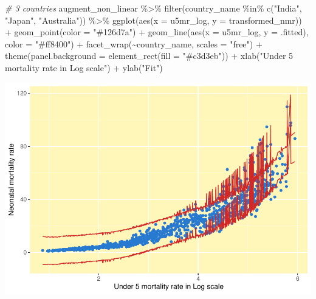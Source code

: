 \documentclass[
]{article}
\newenvironment{Shaded}{\begin{snugshade}}{\end{snugshade}}
\newcommand{\AttributeTok}[1]{\textcolor[rgb]{0.77,0.63,0.00}{#1}}
\newcommand{\CommentTok}[1]{\textcolor[rgb]{0.56,0.35,0.01}{\textit{#1}}}
\newcommand{\FunctionTok}[1]{\textcolor[rgb]{0.00,0.00,0.00}{#1}}
\newcommand{\NormalTok}[1]{#1}
\newcommand{\SpecialCharTok}[1]{\textcolor[rgb]{0.00,0.00,0.00}{#1}}
\newcommand{\StringTok}[1]{\textcolor[rgb]{0.31,0.60,0.02}{#1}}
\begin{document}
\begin{Shaded}
\begin{Highlighting}[]
\CommentTok{\# 3 countries}
\NormalTok{augment\_non\_linear }\SpecialCharTok{\%\textgreater{}\%}
  \FunctionTok{filter}\NormalTok{(country\_name }\SpecialCharTok{\%in\%} \FunctionTok{c}\NormalTok{(}\StringTok{"India"}\NormalTok{, }\StringTok{"Japan"}\NormalTok{, }\StringTok{"Australia"}\NormalTok{)) }\SpecialCharTok{\%\textgreater{}\%}
  \FunctionTok{ggplot}\NormalTok{(}\FunctionTok{aes}\NormalTok{(}\AttributeTok{x =}\NormalTok{ u5mr\_log, }\AttributeTok{y =}\NormalTok{ transformed\_nmr)) }\SpecialCharTok{+}
  \FunctionTok{geom\_point}\NormalTok{(}\AttributeTok{color =} \StringTok{"\#126d7a"}\NormalTok{) }\SpecialCharTok{+}
  \FunctionTok{geom\_line}\NormalTok{(}\FunctionTok{aes}\NormalTok{(}\AttributeTok{x =}\NormalTok{ u5mr\_log, }\AttributeTok{y =}\NormalTok{ .fitted), }\AttributeTok{color =} \StringTok{"\#ff8400"}\NormalTok{) }\SpecialCharTok{+}
  \FunctionTok{facet\_wrap}\NormalTok{(}\SpecialCharTok{\textasciitilde{}}\NormalTok{country\_name, }\AttributeTok{scales =} \StringTok{"free"}\NormalTok{) }\SpecialCharTok{+}
  \FunctionTok{theme}\NormalTok{(}\AttributeTok{panel.background =} \FunctionTok{element\_rect}\NormalTok{(}\AttributeTok{fill =} \StringTok{"\#c3d3eb"}\NormalTok{)) }\SpecialCharTok{+}
  \FunctionTok{xlab}\NormalTok{(}\StringTok{"Under 5 mortality rate in Log scale"}\NormalTok{) }\SpecialCharTok{+}
  \FunctionTok{ylab}\NormalTok{(}\StringTok{"Fit"}\NormalTok{)}
\end{Highlighting}
\end{Shaded}

\includegraphics{A2_files/figure-latex/unnamed-chunk-19-1.pdf}
\end{document}
